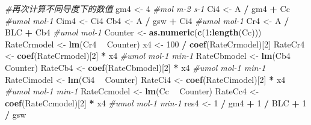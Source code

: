 \documentclass[
]{krantz}
\makeatletter
\newenvironment{Shaded}{\begin{snugshade}}{\end{snugshade}}
\newcommand{\CommentTok}[1]{\textcolor[rgb]{0.56,0.35,0.01}{\textit{#1}}}
\newcommand{\DecValTok}[1]{\textcolor[rgb]{0.00,0.00,0.81}{#1}}
\newcommand{\KeywordTok}[1]{\textcolor[rgb]{0.13,0.29,0.53}{\textbf{#1}}}
\newcommand{\NormalTok}[1]{#1}
\newcommand{\OperatorTok}[1]{\textcolor[rgb]{0.81,0.36,0.00}{\textbf{#1}}}
\newcommand{\StringTok}[1]{\textcolor[rgb]{0.31,0.60,0.02}{#1}}
\newenvironment{kframe}{%
\medskip{}
\setlength{\fboxsep}{.8em}
 \def\at@end@of@kframe{}%
 \ifinner\ifhmode%
  \def\at@end@of@kframe{\end{minipage}}%
  \begin{minipage}{\columnwidth}%
 \fi\fi%
 \def\FrameCommand##1{\hskip\@totalleftmargin \hskip-\fboxsep
 \colorbox{shadecolor}{##1}\hskip-\fboxsep
     \hskip-\linewidth \hskip-\@totalleftmargin \hskip\columnwidth}%
 \MakeFramed {\advance\hsize-\width
   \@totalleftmargin\z@ \linewidth\hsize
   \@setminipage}}%
 {\par\unskip\endMakeFramed%
 \at@end@of@kframe}
\renewenvironment{Shaded}{\begin{kframe}}{\end{kframe}}
\makeatother
\begin{document}
\begin{Shaded}
\begin{Highlighting}[]
\CommentTok{#再次计算不同导度下的数值}
\NormalTok{gm4 <-}\StringTok{ }\DecValTok{4} \CommentTok{#mol m-2 s-1}
\NormalTok{Ci4 <-}\StringTok{ }\NormalTok{A }\OperatorTok{/}\StringTok{ }\NormalTok{gm4 }\OperatorTok{+}\StringTok{ }\NormalTok{Cc }\CommentTok{#umol mol-1}
\NormalTok{Cim4 <-}\StringTok{ }\NormalTok{Ci4}
\NormalTok{Cb4 <-}\StringTok{ }\NormalTok{A }\OperatorTok{/}\StringTok{ }\NormalTok{gsw }\OperatorTok{+}\StringTok{ }\NormalTok{Ci4 }\CommentTok{#umol mol-1}
\NormalTok{Cr4 <-}\StringTok{ }\NormalTok{A }\OperatorTok{/}\StringTok{ }\NormalTok{BLC }\OperatorTok{+}\StringTok{ }\NormalTok{Cb4 }\CommentTok{#umol mol-1}
\NormalTok{Counter <-}\StringTok{ }\KeywordTok{as.numeric}\NormalTok{(}\KeywordTok{c}\NormalTok{(}\DecValTok{1}\OperatorTok{:}\KeywordTok{length}\NormalTok{(Cc)))}
\NormalTok{RateCrmodel <-}\StringTok{ }\KeywordTok{lm}\NormalTok{(Cr4 }\OperatorTok{~}\StringTok{ }\NormalTok{Counter)}
\NormalTok{x4 <-}\StringTok{ }\DecValTok{100} \OperatorTok{/}\StringTok{ }\KeywordTok{coef}\NormalTok{(RateCrmodel)[}\DecValTok{2}\NormalTok{]}
\NormalTok{RateCr4 <-}\StringTok{ }\KeywordTok{coef}\NormalTok{(RateCrmodel)[}\DecValTok{2}\NormalTok{] }\OperatorTok{*}\StringTok{ }\NormalTok{x4 }\CommentTok{#umol mol-1 min-1}
\NormalTok{RateCbmodel <-}\StringTok{ }\KeywordTok{lm}\NormalTok{(Cb4 }\OperatorTok{~}\StringTok{ }\NormalTok{Counter)}
\NormalTok{RateCb4 <-}\StringTok{ }\KeywordTok{coef}\NormalTok{(RateCbmodel)[}\DecValTok{2}\NormalTok{] }\OperatorTok{*}\StringTok{ }\NormalTok{x4 }\CommentTok{#umol mol-1 min-1}
\NormalTok{RateCimodel <-}\StringTok{ }\KeywordTok{lm}\NormalTok{(Ci4 }\OperatorTok{~}\StringTok{ }\NormalTok{Counter)}
\NormalTok{RateCi4 <-}\StringTok{ }\KeywordTok{coef}\NormalTok{(RateCimodel)[}\DecValTok{2}\NormalTok{] }\OperatorTok{*}\StringTok{ }\NormalTok{x4 }\CommentTok{#umol mol-1 min-1}
\NormalTok{RateCcmodel <-}\StringTok{ }\KeywordTok{lm}\NormalTok{(Cc }\OperatorTok{~}\StringTok{ }\NormalTok{Counter)}
\NormalTok{RateCc4 <-}\StringTok{ }\KeywordTok{coef}\NormalTok{(RateCcmodel)[}\DecValTok{2}\NormalTok{] }\OperatorTok{*}\StringTok{ }\NormalTok{x4 }\CommentTok{#umol mol-1 min-1}
\NormalTok{res4 <-}\StringTok{ }\DecValTok{1} \OperatorTok{/}\StringTok{ }\NormalTok{gm4 }\OperatorTok{+}\StringTok{ }\DecValTok{1} \OperatorTok{/}\StringTok{ }\NormalTok{BLC }\OperatorTok{+}\StringTok{ }\DecValTok{1} \OperatorTok{/}\StringTok{ }\NormalTok{gsw}


\end{Highlighting}
\end{Shaded}
\end{document}
